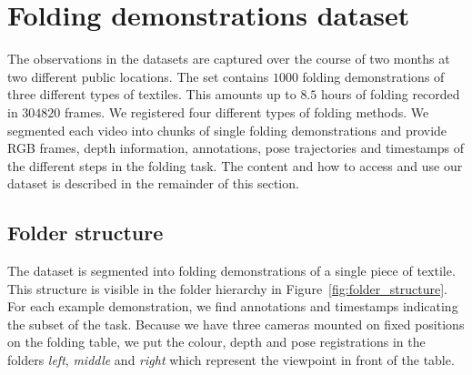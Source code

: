 \documentclass[\home/main.tex]{subfiles}
\begin{document}

\section{Folding demonstrations dataset}

The observations in the datasets are captured over the course of two months at two different public locations. The set contains $1000$ folding demonstrations of three different types of textiles. This amounts up to $8.5$ hours of folding recorded in $304820$ frames. We registered four different types of folding methods. We segmented each video into chunks of single folding demonstrations and provide RGB frames, depth information, annotations, pose trajectories and timestamps of the different steps in the folding task. The content and how to access and use our dataset is described in the remainder of this section.

\subsection{Folder structure}
The dataset is segmented into folding demonstrations of a single piece of textile. This structure is visible in the folder hierarchy in Figure~\ref{fig:folder_structure}. For each example demonstration, we find annotations and timestamps indicating the subset of the task. Because we have three cameras mounted on fixed positions on the folding table, we put the colour, depth and pose registrations in the folders \textit{left}, \textit{middle} and \textit{right} which represent the viewpoint in front of the table.
\end{document}
